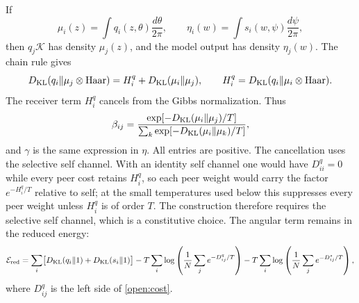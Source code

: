 If
\begin{equation}
\mu_i(z)=\int q_i(z,\theta)\frac{d\theta}{2\pi},
\qquad
\eta_i(w)=\int s_i(w,\psi)\frac{d\psi}{2\pi},
\end{equation}
then $q_j\mathcal K$ has density $\mu_j(z)$, and the model output has density $\eta_j(w)$. The chain rule gives
\begin{equation}
D_{\mathrm{KL}}(q_i\|\mu_j\otimes\mathrm{Haar})
=H_i^q+D_{\mathrm{KL}}(\mu_i\|\mu_j),
\qquad
H_i^q=D_{\mathrm{KL}}(q_i\|\mu_i\otimes\mathrm{Haar}).
\label{open:cost}
\end{equation}
The receiver term $H_i^q$ cancels from the Gibbs normalization. Thus
\begin{equation}
\beta_{ij}
=\frac{\exp[-D_{\mathrm{KL}}(\mu_i\|\mu_j)/T]}
{\sum_k\exp[-D_{\mathrm{KL}}(\mu_i\|\mu_k)/T]},
\label{open:row}
\end{equation}
and $\gamma$ is the same expression in $\eta$. All entries are positive. The cancellation uses the selective self channel. With an identity self channel one would have $D^q_{ii}=0$ while every peer cost retains $H_i^q$, so each peer weight would carry the factor $e^{-H_i^q/T}$ relative to self; at the small temperatures used below this suppresses every peer weight unless $H_i^q$ is of order $T$. The construction therefore requires the selective self channel, which is a constitutive choice. The angular term remains in the reduced energy:
\begin{equation}
\mathcal E_{\rm red}
=\sum_i\bigl[D_{\mathrm{KL}}(q_i\|1)+D_{\mathrm{KL}}(s_i\|1)\bigr]
-T\sum_i\log\left(\frac1N\sum_j e^{-D^q_{ij}/T}\right)
-T\sum_i\log\left(\frac1N\sum_j e^{-D^s_{ij}/T}\right),
\end{equation}
where $D^q_{ij}$ is the left side of \cref{open:cost}.

